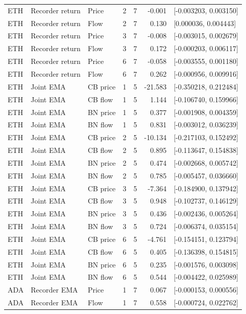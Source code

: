 \begin{longtable}{lllrrrl}
ETH & Recorder return & Price & 2 & 7 & -0.001 & [-0.003203, 0.003150]\\
ETH & Recorder return & Flow & 2 & 7 & 0.130 & [0.000036, 0.004443]\\
ETH & Recorder return & Price & 3 & 7 & -0.008 & [-0.003015, 0.002679]\\
ETH & Recorder return & Flow & 3 & 7 & 0.172 & [-0.000203, 0.006117]\\
ETH & Recorder return & Price & 6 & 7 & -0.058 & [-0.003555, 0.001180]\\
ETH & Recorder return & Flow & 6 & 7 & 0.262 & [-0.000956, 0.009916]\\
ETH & Joint EMA & CB price & 1 & 5 & -21.583 & [-0.350218, 0.212484]\\
ETH & Joint EMA & CB flow & 1 & 5 & 1.144 & [-0.106740, 0.159966]\\
ETH & Joint EMA & BN price & 1 & 5 & 0.377 & [-0.001908, 0.004359]\\
ETH & Joint EMA & BN flow & 1 & 5 & 0.831 & [-0.003012, 0.036239]\\
ETH & Joint EMA & CB price & 2 & 5 & -10.134 & [-0.217103, 0.152492]\\
ETH & Joint EMA & CB flow & 2 & 5 & 0.895 & [-0.113647, 0.154838]\\
ETH & Joint EMA & BN price & 2 & 5 & 0.474 & [-0.002668, 0.005742]\\
ETH & Joint EMA & BN flow & 2 & 5 & 0.785 & [-0.005457, 0.036660]\\
ETH & Joint EMA & CB price & 3 & 5 & -7.364 & [-0.184900, 0.137942]\\
ETH & Joint EMA & CB flow & 3 & 5 & 0.948 & [-0.102737, 0.146129]\\
ETH & Joint EMA & BN price & 3 & 5 & 0.436 & [-0.002436, 0.005264]\\
ETH & Joint EMA & BN flow & 3 & 5 & 0.724 & [-0.006374, 0.035154]\\
ETH & Joint EMA & CB price & 6 & 5 & -4.761 & [-0.154151, 0.123794]\\
ETH & Joint EMA & CB flow & 6 & 5 & 0.405 & [-0.136398, 0.154815]\\
ETH & Joint EMA & BN price & 6 & 5 & 0.235 & [-0.001576, 0.003098]\\
ETH & Joint EMA & BN flow & 6 & 5 & 0.544 & [-0.004422, 0.025989]\\
ADA & Recorder EMA & Price & 1 & 7 & 0.067 & [-0.000153, 0.000556]\\
ADA & Recorder EMA & Flow & 1 & 7 & 0.558 & [-0.000724, 0.022762]\\

\end{longtable}
